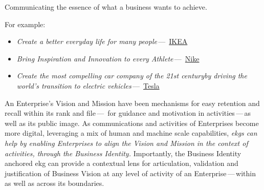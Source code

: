 Communicating the essence of what a business wants to achieve.

For example:

\begin{itemize}
    \item \textit{Create a better everyday life for many people}\,---\,%
    \href{https://www.ikea.com/gb/en/this-is-ikea/about-us/vision-and-business-idea-pub9cd02291}{IKEA}
    \item \textit{Bring Inspiration and Innovation to every Athlete}\,---\,%
    \href{https://www.nike.com/gb/help/a/nikeinc-mission}{Nike}
    \item \textit{Create the most compelling car company of the 21st century\newline by driving the world's
    transition to electric vehicles}\,---\,%
    \href{https://visionarybusinessperson.com/tesla-mission-statement/}{Tesla}
\end{itemize}

An Enterprise’s Vision and Mission have been mechanisms for easy
retention and recall within its rank and file\,---\,%
for guidance and motivation in activities\,---\,as well as its public image.
As communications and activities of Enterprises become more digital, leveraging a mix of human and machine scale
capabilities, \textit{\glspl{ekg} can help by enabling Enterprises to align the Vision and Mission in the context of activities,
through the Business Identity.}
Importantly, the Business Identity anchored \gls{ekg} can provide a contextual lens for articulation,
validation and justification of Business Vision at any level of activity of an Enterprise\,---\,within as well as
across its boundaries.
